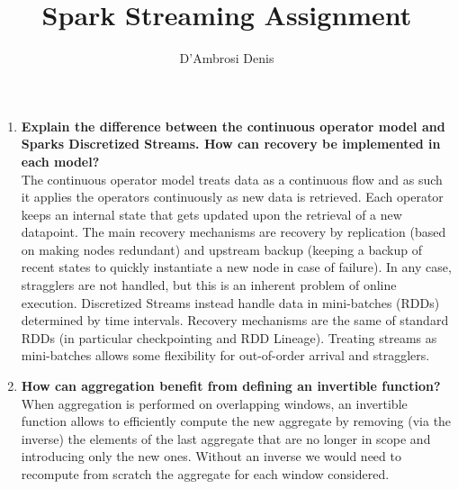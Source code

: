 \documentclass{article}
\title{Spark Streaming Assignment}
\author{D'Ambrosi Denis}
\begin{document}
\maketitle

\begin{enumerate}
    
    \item \textbf{Explain the difference between the continuous operator model and Sparks Discretized Streams. How can recovery be implemented in each model?}
    \\ \noindent
    The continuous operator model treats data as a continuous flow and as such it applies the operators continuously as new data is retrieved. Each operator keeps an internal state that gets updated upon the retrieval of a new datapoint. The main recovery mechanisms are recovery by replication (based on making nodes redundant) and upstream backup (keeping a backup of recent states to quickly instantiate a new node in case of failure). In any case, stragglers are not handled, but this is an inherent problem of online execution.
    Discretized Streams instead handle data in mini-batches (RDDs) determined by time intervals. Recovery mechanisms are the same of standard RDDs (in particular checkpointing and RDD Lineage). Treating streams as mini-batches allows some flexibility for out-of-order arrival and stragglers.

    \item \textbf{How can aggregation benefit from defining an invertible function?}
    \\ \noindent
    When aggregation is performed on overlapping windows, an invertible function allows to efficiently compute the new aggregate by removing (via the inverse) the elements of the last aggregate that are no longer in scope and introducing only the new ones. Without an inverse we would need to recompute from scratch the aggregate for each window considered.


\end{enumerate}
\end{document}
